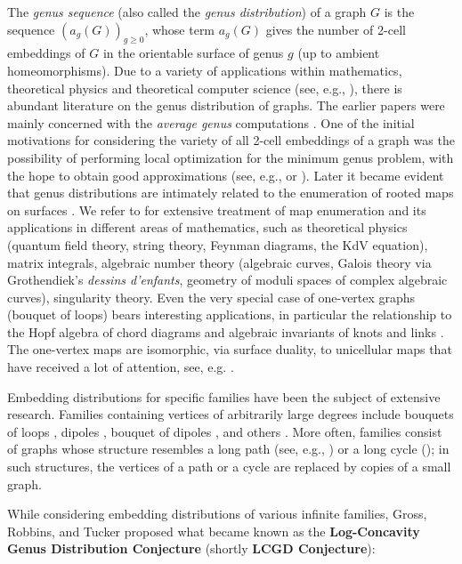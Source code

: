\documentclass[11pt]{article}
\begin{document}
The \emph{genus sequence} (also called the \emph{genus distribution}) of a graph $G$ is the sequence $(a_g(G))_{g\ge0}$, whose term $a_g(G)$ gives the number of 2-cell embeddings of $G$ in the orientable surface of genus $g$ (up to ambient homeomorphisms). Due to a variety of applications within mathematics, theoretical physics and theoretical computer science (see, e.g., \cite{LaZv04}), there is abundant literature on the genus distribution of graphs. The earlier papers were mainly concerned with the \emph{average genus} computations \cite{St83,Ar88}. One of the initial motivations for considering the variety of all 2-cell embeddings of a graph was the possibility of performing local optimization for the minimum genus problem, with the hope to obtain good approximations (see, e.g., \cite{GrFu87} or \cite{Wh94,ChGrRi95}).
Later it became evident that genus distributions are intimately related to the enumeration of rooted maps on surfaces \cite{MaLiuWe06}. We refer to \cite{LaZv04} for extensive treatment of map enumeration and its applications in different areas of mathematics,
such as theoretical physics (quantum field theory, string theory, Feynman diagrams, the KdV equation), matrix integrals, algebraic number theory (algebraic curves, Galois theory via Grothendiek's \emph{dessins d’enfants}, geometry of moduli spaces of complex algebraic curves), singularity theory.
Even the very special case of one-vertex graphs (bouquet of loops) bears interesting applications, in particular the relationship to the Hopf algebra of chord diagrams and algebraic invariants of knots and links \cite{LaZv04}. The one-vertex maps are isomorphic, via surface duality, to unicellular maps that have received a lot of attention, see, e.g. \cite{BeCh11,Cha10,Cha11}.

Embedding distributions for specific families have been the subject of extensive research. Families containing vertices of arbitrarily large degrees include bouquets of loops \cite{GrRoTu89,ChGrRi94,KwSh02}, dipoles \cite{KwLee93,ViWi07}, bouquet of dipoles \cite{KiLe98}, and others \cite{ShLiu10}. More often, families consist of graphs whose structure resembles a long path (see, e.g., \cite{FuGrSt89,Sta91,Te97,Te00,LiHaZh10,MaLiuWe06,HaHeLiuWe07,WaLiu08})
or a long cycle (\cite{ShLiu08,ZeLiu11}); in such structures, the vertices of a path or a cycle are replaced by copies of a small graph.

While considering embedding distributions of various infinite families, Gross, Robbins, and Tucker \cite{GrRoTu89} proposed what became known as the {\bf Log-Concavity Genus Distribution Conjecture} (shortly {\bf LCGD Conjecture}):
\end{document}
